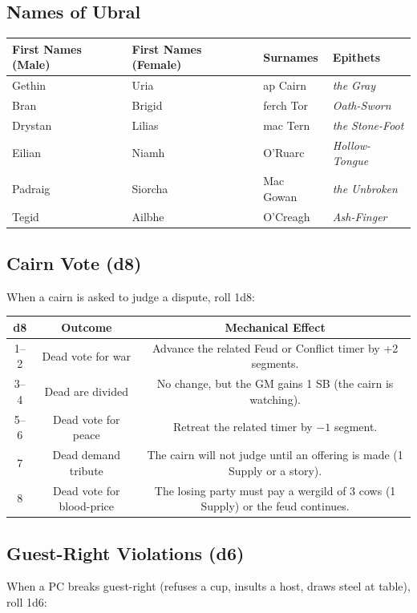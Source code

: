 \subsection*{Names of Ubral}
\label{sec:ubral-names}
\begin{longtable}{|p{}|p{}|p{}|p{}|}
\hline
\textbf{First Names (Male)} & \textbf{First Names (Female)} & \textbf{Surnames} & \textbf{Epithets} \\
\hline
Gethin & Uria & ap Cairn & \textit{the Gray} \\
\hline
Bran & Brigid & ferch Tor & \textit{Oath-Sworn} \\
\hline
Drystan & Lilias & mac Tern & \textit{the Stone-Foot} \\
\hline
Eilian & Niamh & O'Ruarc & \textit{Hollow-Tongue} \\
\hline
Padraig & Siorcha & Mac Gowan & \textit{the Unbroken} \\
\hline
Tegid & Ailbhe & O'Creagh & \textit{Ash-Finger} \\
\hline
\end{longtable}

\subsection*{Cairn Vote (d8)}
When a cairn is asked to judge a dispute, roll 1d8:

\begin{center}
\begin{tabular}{|c|c|c|}
\hline
\textbf{d8} & \textbf{Outcome} & \textbf{Mechanical Effect} \\
\hline
1--2 & Dead vote for war & Advance the related Feud or Conflict timer by +2 segments. \\
3--4 & Dead are divided & No change, but the GM gains 1 SB (the cairn is watching). \\
5--6 & Dead vote for peace & Retreat the related timer by \(-1\) segment. \\
7 & Dead demand tribute & The cairn will not judge until an offering is made (1 Supply or a story). \\
8 & Dead vote for blood-price & The losing party must pay a wergild of 3 cows (1 Supply) or the feud continues. \\
\hline
\end{tabular}
\end{center}

\subsection*{Guest-Right Violations (d6)}
When a PC breaks guest-right (refuses a cup, insults a host, draws steel at table), roll 1d6:

